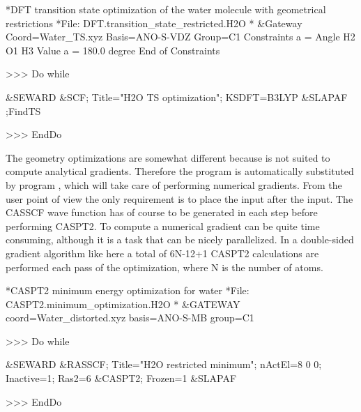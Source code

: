 \begin{inputlisting}
*DFT transition state optimization of the water molecule with geometrical restrictions
*File: DFT.transition_state_restricted.H2O
*
&Gateway
 Coord=Water_TS.xyz
 Basis=ANO-S-VDZ
 Group=C1
 Constraints
   a = Angle H2 O1 H3
 Value
   a = 180.0 degree
 End of Constraints

>>> Do while

 &SEWARD
 &SCF; Title="H2O TS optimization"; KSDFT=B3LYP
 &SLAPAF ;FindTS

>>> EndDo
\end{inputlisting}

The  geometry optimizations are somewhat different because 
is not suited to compute  analytical gradients. Therefore the 
program is automatically substituted by program , which will take care
of performing numerical gradients. From the user point of view the only requirement is to place
the  input after the  input.
The CASSCF wave function has of course to be generated in each step before 
performing CASPT2. To compute a numerical gradient can be quite time consuming, 
although it is a task that can be nicely parallelized. In a double-sided 
gradient algorithm like here a total of 6N-12+1 CASPT2 calculations are performed 
each pass of the optimization, where N is the number of atoms.

\begin{inputlisting}
*CASPT2 minimum energy optimization for water
*File: CASPT2.minimum_optimization.H2O
*
&GATEWAY 
 coord=Water_distorted.xyz
 basis=ANO-S-MB
 group=C1

>>> Do while

 &SEWARD
 &RASSCF; Title="H2O restricted minimum"; nActEl=8 0 0; Inactive=1; Ras2=6
 &CASPT2; Frozen=1 
 &SLAPAF 

>>> EndDo
\end{inputlisting}

